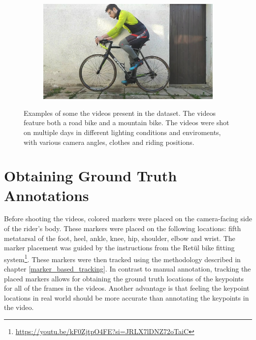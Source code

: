 \begin{figure}[htb]
\begin{subfigure}[b]{\imgwidth}
    \end{subfigure}
    \hfill
    \begin{subfigure}[b]{\imgwidth}
        \centering

        \includegraphics[width=1\linewidth]{obrazky-figures/9.jpg}
    \end{subfigure}


    \caption{Examples of some the videos present in the dataset. The videos feature both a road bike and a mountain bike. The videos were shot on multiple days in different lighting conditions and enviroments, with various camera angles, clothes and riding positions.}
    \label{fig:examples}
\end{figure}




\section{Obtaining Ground Truth Annotations}
Before shooting the videos, colored markers were placed on the camera-facing side of the rider's body. These markers were placed on the following locations: fifth metatarsal of the foot, heel, ankle, knee, hip, shoulder, elbow and wrist. The marker placement was guided by the instructions from the Retül bike fitting system\footnote{\url{https://youtu.be/kF0ZjtpO4FE?si=JRLX7lDNZ72oTaiC}}. These markers were then tracked using the methodology described in chapter \ref{marker_based_tracking}.
In contrast to manual annotation, tracking the placed markers allows for obtaining the ground truth locations of the keypoints for all of the frames in the videos. Another advantage is that feeling the keypoint locations in real world should be more accurate than annotating the keypoints in the video.




